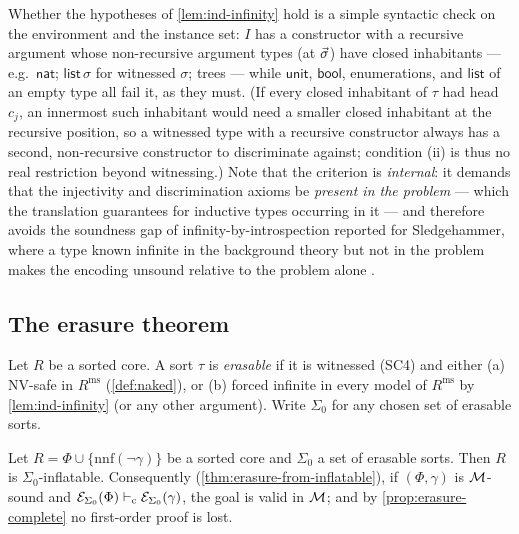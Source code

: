 Whether the hypotheses of \cref{lem:ind-infinity} hold is a simple
syntactic check on the environment and the instance set: $I$ has a
constructor with a recursive argument whose non-recursive argument
types (at $\vec{\sigma}$) have closed inhabitants --- e.g.\
$\mathsf{nat}$; $\mathsf{list}\,\sigma$ for witnessed $\sigma$;
trees --- while $\mathsf{unit}$, $\mathsf{bool}$, enumerations, and
$\mathsf{list}$ of an empty type all fail it, as they must.  (If
every closed inhabitant of $\tau$ had head $c_j$, an innermost such
inhabitant would need a smaller closed inhabitant at the recursive
position, so a witnessed type with a recursive constructor always
has a second, non-recursive constructor to discriminate against;
condition (ii) is thus no real restriction beyond witnessing.)
Note that the criterion is \emph{internal}: it demands that the
injectivity and discrimination axioms be \emph{present in the
problem} --- which the translation guarantees for inductive types
occurring in it --- and therefore avoids the soundness gap of
infinity-by-introspection reported for Sledgehammer, where a type
known infinite in the background theory but not in the problem
makes the encoding unsound relative to the problem alone
\cite[\S7.4]{Blanchette2016}.

\subsection{The erasure theorem}

\begin{definition}
\label{def:erasable}
Let $R$ be a sorted core.  A sort $\tau$ is \emph{erasable} if it
is witnessed (SC4) and either (a) NV-safe in $R^{\mathrm{ms}}$
(\cref{def:naked}), or (b) forced infinite in every model of
$R^{\mathrm{ms}}$ by \cref{lem:ind-infinity} (or any other
argument).  Write $\Sigma_0$ for any chosen set of erasable sorts.
\end{definition}

\begin{theorem}
\label{thm:erasure-main}
Let $R = \Phi \cup \{\mathrm{nnf}(\neg\gamma)\}$ be a sorted core
and $\Sigma_0$ a set of erasable sorts.  Then $R$ is
$\Sigma_0$-inflatable.  Consequently
(\cref{thm:erasure-from-inflatable}), if $(\Phi, \gamma)$ is
$\mathcal{M}$-sound and $\mathcal{E}_{\Sigma_0}(\Phi) \vdash_{\mathrm{c}}
\mathcal{E}_{\Sigma_0}(\gamma)$, the goal is valid in $\mathcal{M}$; and by
\cref{prop:erasure-complete} no first-order proof is lost.
\end{theorem}

